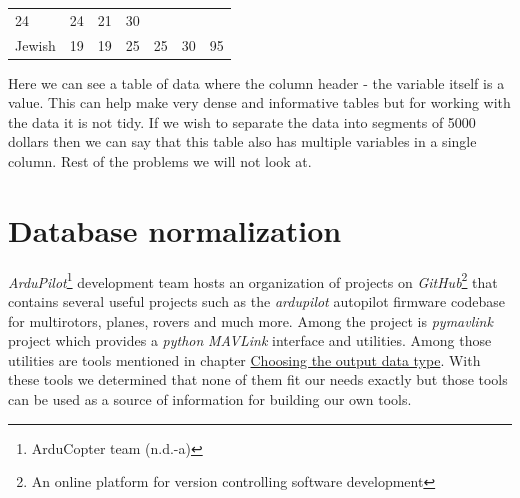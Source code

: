 \documentclass[12pt,oneside]{reedthesis}
\theoremstyle{definition}
\theoremstyle{definition}
\theoremstyle{definition}
\theoremstyle{remark}
\begin{document}
\begin{longtable}[]{@{}lllllll@{}}
\begin{minipage}[t]{0.11\columnwidth}
24\strut
\end{minipage} & \begin{minipage}[t]{0.11\columnwidth}\raggedright\strut
24\strut
\end{minipage} & \begin{minipage}[t]{0.11\columnwidth}\raggedright\strut
21\strut
\end{minipage} & \begin{minipage}[t]{0.11\columnwidth}\raggedright\strut
30\strut
\end{minipage}\tabularnewline
\begin{minipage}[t]{0.16\columnwidth}\raggedright\strut
Jewish\strut
\end{minipage} & \begin{minipage}[t]{0.09\columnwidth}\raggedright\strut
19\strut
\end{minipage} & \begin{minipage}[t]{0.11\columnwidth}\raggedright\strut
19\strut
\end{minipage} & \begin{minipage}[t]{0.11\columnwidth}\raggedright\strut
25\strut
\end{minipage} & \begin{minipage}[t]{0.11\columnwidth}\raggedright\strut
25\strut
\end{minipage} & \begin{minipage}[t]{0.11\columnwidth}\raggedright\strut
30\strut
\end{minipage} & \begin{minipage}[t]{0.11\columnwidth}\raggedright\strut
95\strut
\end{minipage}\tabularnewline
\bottomrule
\end{longtable}
Here we can see a table of data where the column header - the variable
itself is a value. This can help make very dense and informative tables
but for working with the data it is not tidy. If we wish to separate the
data into segments of 5000 dollars then we can say that this table also
has multiple variables in a single column. Rest of the problems we will
not look at.

\section{Database normalization}\label{database-normalization}

\emph{ArduPilot}\footnote{ArduCopter team (n.d.-a)} development team
hosts an organization of projects on \emph{GitHub}\footnote{An online
  platform for version controlling software development} that contains
several useful projects such as the \emph{ardupilot} autopilot firmware
codebase for multirotors, planes, rovers and much more. Among the
project is \emph{pymavlink} project which provides a \emph{python}
\emph{MAVLink} interface and utilities. Among those utilities are tools
mentioned in chapter
\protect\hyperlink{choosing-the-output-data-type}{Choosing the output
data type}. With these tools we determined that none of them fit our
needs exactly but those tools can be used as a source of information for
building our own tools.
\end{document}
